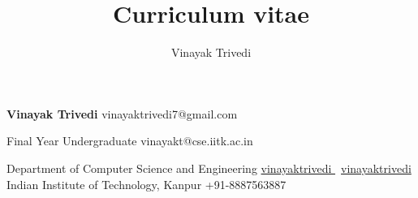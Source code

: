 \documentclass[9pt]{extarticle}
\title{Curriculum vitae}
\author{Vinayak Trivedi}
\begin{document}

\begingroup
{}

\begin{minipage}[t]{\textwidth}
{\Huge\textbf{\sc Vinayak Trivedi}}
\hfill
vinayaktrivedi7@gmail.com \faEnvelope


Final Year Undergraduate
\hfill
vinayakt@cse.iitk.ac.in \faEnvelope

Department of Computer Science and Engineering
\hfill
\href{https://github.com/vinayaktrivedi}{vinayaktrivedi \faGithub} \textbar \ 
\href{https://www.linkedin.com/in/vinayak-trivedi-2b8a00144/}{vinayaktrivedi \faLinkedin} \\

Indian Institute of Technology, Kanpur
\hfill
+91-8887563887 \faMobile \\
\end{minipage}

\begin{minipage}[t]{0.49\textwidth}
  \vspace{3mm}
  
  
  
\end{minipage}
\hfill
\begin{minipage}[t]{0.49\textwidth}
  \vspace{3mm}
  
  
  
\end{minipage}
%

\endgroup
\end{document}
